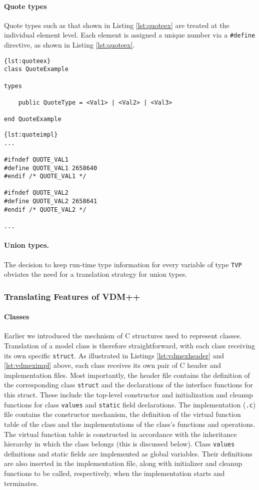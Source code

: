 \paragraph{Quote types}
Quote types such as that shown in Listing \ref{lst:quoteex} are treated at the individual element level.
%
Each element is assigned a unique number via a \texttt{\#define} directive, as shown in Listing \ref{lst:quoteex}.
%
%
%
\begin{lstlisting}[language=VDM++,caption={Quote type example.},label={lst:quoteex},frame=tlbr]{lst:quoteex}
class QuoteExample

types

	public QuoteType = <Val1> | <Val2> | <Val3>

end QuoteExample
\end{lstlisting}
%
%
%
\begin{lstlisting}[language=VDM++,caption={Quote type example translation.},label={lst:quoteimpl},frame=tlbr]{lst:quoteimpl}
...

#ifndef QUOTE_VAL1
#define QUOTE_VAL1 2658640
#endif /* QUOTE_VAL1 */

#ifndef QUOTE_VAL2
#define QUOTE_VAL2 2658641
#endif /* QUOTE_VAL2 */

...
\end{lstlisting}
%
%
%
\paragraph{Union types.}
The decision to keep run-time type information for every variable of type \texttt{TVP} obviates the need for a translation strategy for union types.
%
%
%
\subsubsection{Translating Features of VDM++}
\paragraph{Classes}
%
Earlier we introduced the mechnism of C structures used to represent classes.
%
Translation of a model class is therefore straightforward, with each class receiving its own specific \texttt{struct}.
%
As illustrated in Listings \ref{lst:vdmexheader} and \ref{lst:vdmeximpl} above, each class receives its own pair of C header and implementation files.
%
Most importantly, the header file contains the definition of the corresponding class \texttt{struct} and the declarations of the interface functions for this struct.
%
These include the top-level constructor and initialization and cleanup functions for class \texttt{values} and \texttt{static} field declarations.
%
The implementation (\texttt{.c}) file contains the constructor mechanism, the definition of the virtual function table of the class and the implementations of the class's functions and operations.
%
The virtual function table is constructed in accordance with the inheritance hierarchy in which the class belongs (this is discussed below).
%
Class \texttt{values} definitions and static fields are implemented as global variables.
%
Their definitions are also inserted in the implementation file, along with initializer and cleanup functions to be called, respectively, when the implementation starts and terminates.

